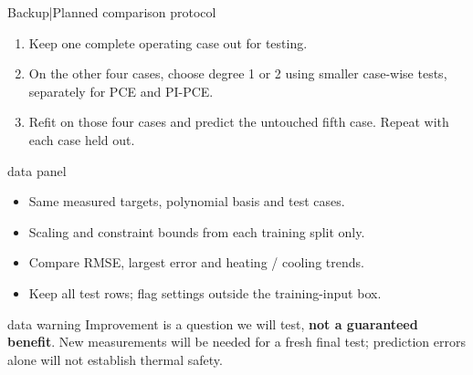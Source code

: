 \begin{frame}{Backup\enspace|\enspace Planned comparison protocol}
  \small
  \begin{enumerate}
    \item Keep one complete operating case out for testing.
    \item On the other four cases, choose degree 1 or 2 using smaller case-wise tests,
      separately for PCE and PI-PCE.
    \item Refit on those four cases and predict the untouched fifth case.
      Repeat with each case held out.
  \end{enumerate}
  \medskip
  \begin{beamercolorbox}[sep=2mm,wd=\textwidth]{data panel}
    \begin{itemize}
      \item Same measured targets, polynomial basis and test cases.
      \item Scaling and constraint bounds from each training split only.
      \item Compare RMSE, largest error and heating / cooling trends.
      \item Keep all test rows; flag settings outside the training-input box.
    \end{itemize}
  \end{beamercolorbox}
  \smallskip
  \begin{beamercolorbox}[sep=1.5mm,wd=\textwidth]{data warning}
    \footnotesize Improvement is a question we will test, \textbf{not a guaranteed benefit}.
    New measurements will be needed for a fresh
    final test; prediction errors alone will not establish thermal safety.
  \end{beamercolorbox}
\end{frame}

